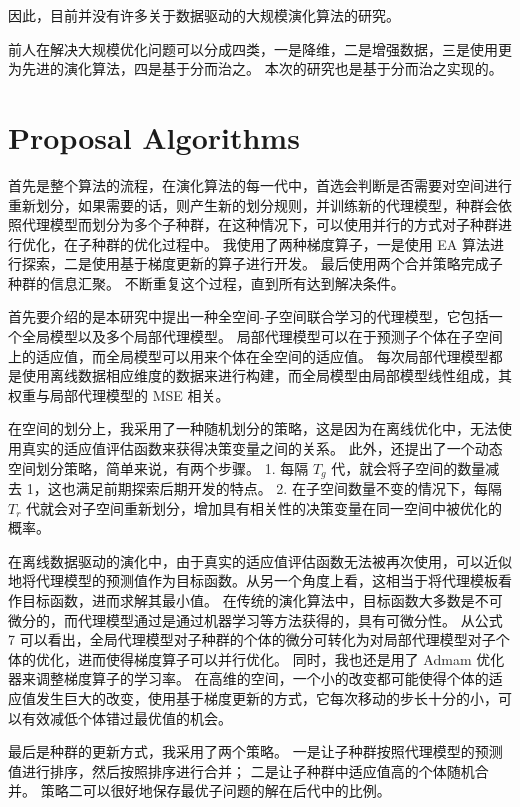 \documentclass[
  UTF8,
  twoside,
  zihao=5,
  scheme=plain,
  heading=true,
]{ctexart}
\begin{document}
因此，目前并没有许多关于数据驱动的大规模演化算法的研究。


前人在解决大规模优化问题可以分成四类，一是降维，二是增强数据，三是使用更为先进的演化算法，四是基于分而治之。
本次的研究也是基于分而治之实现的。

\section{Proposal Algorithms}

首先是整个算法的流程，在演化算法的每一代中，首选会判断是否需要对空间进行重新划分，如果需要的话，则产生新的划分规则，并训练新的代理模型，种群会依照代理模型而划分为多个子种群，在这种情况下，可以使用并行的方式对子种群进行优化，在子种群的优化过程中。
我使用了两种梯度算子，一是使用 EA 算法进行探索，二是使用基于梯度更新的算子进行开发。
最后使用两个合并策略完成子种群的信息汇聚。
不断重复这个过程，直到所有达到解决条件。

首先要介绍的是本研究中提出一种全空间-子空间联合学习的代理模型，它包括一个全局模型以及多个局部代理模型。
局部代理模型可以在于预测子个体在子空间上的适应值，而全局模型可以用来个体在全空间的适应值。
每次局部代理模型都是使用离线数据相应维度的数据来进行构建，而全局模型由局部模型线性组成，其权重与局部代理模型的 MSE 相关。

在空间的划分上，我采用了一种随机划分的策略，这是因为在离线优化中，无法使用真实的适应值评估函数来获得决策变量之间的关系。
此外，还提出了一个动态空间划分策略，简单来说，有两个步骤。
1. 每隔 $T_g$ 代，就会将子空间的数量减去 1，这也满足前期探索后期开发的特点。
2. 在子空间数量不变的情况下，每隔 $T_r$ 代就会对子空间重新划分，增加具有相关性的决策变量在同一空间中被优化的概率。

在离线数据驱动的演化中，由于真实的适应值评估函数无法被再次使用，可以近似地将代理模型的预测值作为目标函数。从另一个角度上看，这相当于将代理模板看作目标函数，进而求解其最小值。
在传统的演化算法中，目标函数大多数是不可微分的，而代理模型通过是通过机器学习等方法获得的，具有可微分性。
从公式 7 可以看出，全局代理模型对子种群的个体的微分可转化为对局部代理模型对子个体的优化，进而使得梯度算子可以并行优化。
同时，我也还是用了 Admam 优化器来调整梯度算子的学习率。
在高维的空间，一个小的改变都可能使得个体的适应值发生巨大的改变，使用基于梯度更新的方式，它每次移动的步长十分的小，可以有效减低个体错过最优值的机会。

最后是种群的更新方式，我采用了两个策略。
一是让子种群按照代理模型的预测值进行排序，然后按照排序进行合并；
二是让子种群中适应值高的个体随机合并。
策略二可以很好地保存最优子问题的解在后代中的比例。
\end{document}

